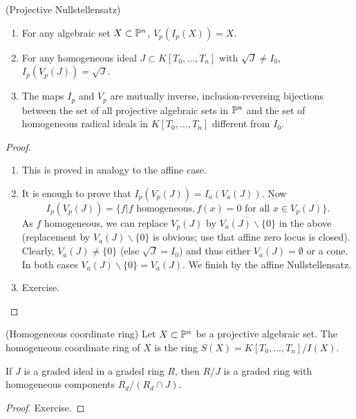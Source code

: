 \documentclass[a4paper,11pt]{article}
\begin{document}
			\begin{thm}
				(Projective Nullstellensatz)
				\begin{enumerate}
					\item For any algebraic set $X\subset\P^n$, $V_p(I_p(X))=X$.
					\item For any homogeneous ideal $J\subset K[T_0,\dots,T_n]$ with $\sqrt{J}\neq I_0$, $I_p(V_p(J))=\sqrt{J}$.
					\item The maps $I_p$ and $V_p$ are mutually inverse, inclusion-reversing bijections between the set of all projective algebraic sets in $\P^n$ and the set of homogeneous radical ideals in $K[T_0,\dots,T_n]$ different from $I_0$.
				\end{enumerate}
			\end{thm}
			\begin{proof}
				\begin{enumerate}
					\item This is proved in analogy to the affine case.
					\item It is enough to prove that $I_p(V_p(J))=I_a(V_a(J))$. Now
					\begin{equation*}
						I_p(V_p(J))=\{f|f\text{ homogeneous}, f(x)=0\text{ for all }x\in V_p(J)\}.
					\end{equation*}
					As $f$ homogeneous, we can replace $V_p(J)$ by $\overline{V_a(J)\backslash\{0\}}$ in the above (replacement by $V_a(J)\backslash\{0\}$ is obvious; use that affine zero locus is closed). Clearly, $V_a(J)\neq\{0\}$ (else $\sqrt{J}=I_0$) and thus either $V_a(J)=\emptyset$ or a cone. In both cases $\overline{V_a(J)\backslash\{0\}}=V_a(J)$. We finish by the affine Nullstellensatz.
					\item Exercise. 
				\end{enumerate}
			\end{proof}

			\begin{defi}(Homogeneous coordinate ring)
				Let $X\subset\P^n$ be a projective algebraic set. The homogeneous coordinate ring of $X$ is the ring $S(X)=K[T_0,\dots,T_n]/I(X)$.
			\end{defi}

			\begin{lemma}
				If $J$ is a graded ideal in a graded ring $R$, then $R/J$ is a graded ring with homogeneous components $R_d/(R_d\cap J)$.
			\end{lemma}
			\begin{proof}\renewcommand{\qedsymbol}{}
				Exercise.
			\end{proof}\renewcommand{\qedsymbol}{$\square$}
\end{document}
